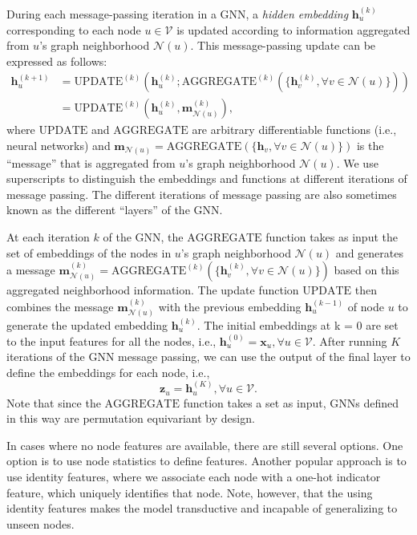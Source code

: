 \documentclass[10pt, onecolumn]{article}
\let\defaultmarginpar\marginpar
\renewcommand\marginpar[2][]{\defaultmarginpar{\itshape\color{gray}#2}}
\begin{document}
During each message-passing iteration in a GNN, a \emph{hidden embedding}\marginpar{hidden embedding} $\mathbf h^{(k)}_u$ corresponding to each node $u \in \mathcal V$ is updated according to information aggregated from $u$'s graph neighborhood $\mathcal N(u)$. This message-passing update can be expressed as follows:
\begin{align}
    \mathbf h^{(k+1)}_u &= \text{UPDATE}^{(k)}\left( \mathbf h^{(k)}_u; \text{AGGREGATE}^{(k)}(\{\mathbf h^{(k)}_v, \forall v \in \mathcal N(u)\}) \right) \\
    &= \text{UPDATE}^{(k)} \left( \mathbf h^{(k)}_u, \mathbf m^{(k)}_{\mathcal N(u)} \right),
\end{align}
where $\text{UPDATE}$ and $\text{AGGREGATE}$ are arbitrary differentiable functions (i.e., neural networks) and $\mathbf m_{\mathcal N(u)} = \text{AGGREGATE}(\{\mathbf h_v, \forall v \in \mathcal N(u)\})$ is the ``message'' that is aggregated from $u$'s graph
neighborhood $\mathcal N(u)$. We use superscripts to distinguish the embeddings and functions at different iterations of message passing. The different iterations of message passing are also sometimes known as the different ``layers'' of the GNN.

At each iteration $k$ of the GNN, the $\text{AGGREGATE}$ function takes as input the set of embeddings of the nodes in $u$'s graph neighborhood $\mathcal N(u)$ and generates a message $\mathbf m^{(k)}_{\mathcal N(u)} = \text{AGGREGATE}^{(k)}(\{\mathbf h^{(k)}_v, \forall v \in \mathcal N(u)\})$ based on this aggregated neighborhood information. The update function $\text{UPDATE}$ then combines the message $\mathbf m^{(k)}_{\mathcal N(u)}$ with the previous embedding $\mathbf h^{(k−1)}_u$ of node $u$ to generate the updated embedding $\mathbf h^{(k)}_u$. The initial embeddings at k = 0 are set to the input features for all the nodes, i.e., $\mathbf h^{(0)}_u = \mathbf x_u, \forall u \in \mathcal V$. After running $K$ iterations of the GNN message passing, we can use the output of the final layer to define the embeddings for each node, i.e.,
\begin{equation}
    \mathbf z_u = \mathbf h^{(K)}_u, \forall u \in \mathcal V.
\end{equation}
Note that since the $\text{AGGREGATE}$ function takes a set as input, GNNs defined in this way are permutation equivariant by design.

In cases where no node features are available, there are still several options. One option is to use node statistics to define
features. Another popular approach is to use identity features, where we associate each node with a one-hot indicator feature, which uniquely identifies that node. Note, however, that the using identity features makes the model transductive and incapable of generalizing to unseen nodes.
\end{document}
